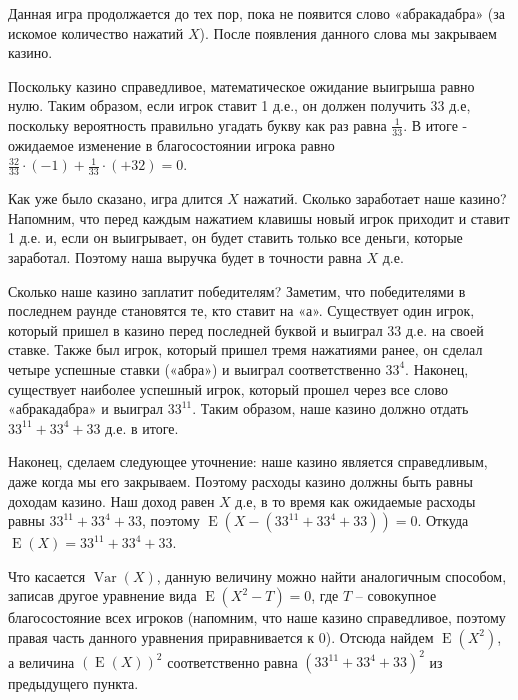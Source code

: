 \documentclass[nobib]{tufte-handout}
\theoremstyle{definition}
\newcounter{problem}
\newenvironment{problem}%
{%
\refstepcounter{problem}%
     \hypertarget{problem:{\theproblem}}{}
     \Writetofile{solution_file}{\protect\hypertarget{soln:\theproblem}{}}
     \begin{myenum}[label=\bfseries\protect\hyperlink{soln:\theproblem}{\theproblem},ref=\theproblem]
     \item%
    }%
    {%
    \end{myenum}}
\DeclareMathOperator{\Var}{Var}
\DeclareMathOperator{\E}{E}
\begin{document}
\begin{problem}
\begin{sol}
\begin{enumerate}
Данная игра продолжается до тех пор, пока не появится слово «абракадабра» (за искомое количество нажатий $X$). После появления данного слова мы закрываем казино.

Поскольку казино справедливое, математическое ожидание выигрыша равно нулю. Таким образом, если игрок ставит 1 д.е., он должен получить 33 д.е, поскольку вероятность правильно угадать букву как раз равна $\frac{1}{33}$. В итоге - ожидаемое изменение в благосостоянии игрока равно $\frac{32}{33}\cdot(-1) + \frac{1}{33}\cdot(+32) = 0$.

Как уже было сказано, игра длится $X$ нажатий. Сколько заработает наше казино? Напомним, что перед каждым нажатием клавишы новый игрок приходит и ставит 1 д.е. и, если он выигрывает, он будет ставить только все деньги, которые заработал. Поэтому наша выручка будет в точности равна $X$ д.е.

Сколько наше казино заплатит победителям? Заметим, что победителями в последнем раунде становятся те, кто ставит на «а». Существует один игрок, который пришел в казино перед последней буквой и выиграл $33$ д.е. на своей ставке. Также был игрок, который пришел тремя нажатиями ранее, он сделал четыре успешные ставки («абра») и выиграл соответственно $33^4$. Наконец, существует наиболее успешный игрок, который прошел через все слово «абракадабра» и выиграл $33^{11}$. Таким образом, наше казино должно отдать $33^{11}+33^4+33$ д.е. в итоге.

Наконец, сделаем следующее уточнение: наше казино является справедливым, даже когда мы его закрываем. Поэтому расходы казино должны быть равны доходам казино. Наш доход равен $X$ д.е, в то время как ожидаемые расходы равны $33^{11}+33^4+33$, поэтому $\E (X - (33^{11}+33^4+33)) = 0$. Откуда $\E(X) = 33^{11}+33^4+33$.

Что касается $\Var(X)$, данную величину можно найти аналогичным способом, записав другое уравнение вида $\E(X^2 - T)=0$, где $T$ – совокупное благосостояние всех игроков (напомним, что наше казино справедливое, поэтому правая часть данного уравнения приравнивается к $0$). Отсюда найдем $\E(X^2)$, а величина $(\E(X))^2$ соответственно равна $(33^{11}+33^4+33)^2$ из предыдущего пункта.
\end{enumerate}
\end{sol}

\end{problem}
\end{document}
